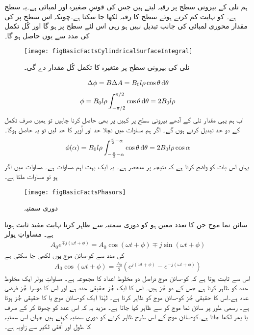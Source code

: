 	ہم نلی کے بیرونی سطح پر رقبہ   لیتے ہیں جس کی قوسِ صغیرہ   اور لمبائی  ہے۔یہ سطح  ہے۔ کو نہایت کم کرتے ہوئے سطح کا رقبہ  لکھا جا سکتا ہے۔چونکہ اس سطح پر  کی مقدار محوری لمبائی  کی جانب تبدیل نہیں ہو رہی اس لئے سطح   پر  ہو گا اور کُل  تکمل کی مدد سے یوں حاصل ہو گا۔
\begin{figure}
\centering
\texttt{[image: figBasicFactsCylindricalSurfaceIntegral]}
\caption{نلی کی بیرونی سطح پر متغیرہ کا تکمل کُل مقدار دے گی۔}
\label{شکل_حقائق_نلکی_سطحی_تکمل}
\end{figure}
%
\begin{align}
\Delta \phi=B \Delta A=B_0 l \rho \cos \theta \dif \theta
\end{align}
%
\begin{align}
\phi = B_0 l \rho \int_{-\pi/2}^{\pi/2} \cos \theta \dif \theta =2 B_0 l \rho
\end{align}
اب ہم یہی مقدار نلی کے آدھے بیرونی سطح پر کہیں پر بھی حاصل کرنا چاہیں تو ہمیں صرف تکمل کے دو حد تبدیل کرنے ہوں گے۔  اگر ہم مساوات  میں نچلا حد  اور اُوپر کا حد  لیں تو یہ حاصل ہوگا۔
\begin{align}
\phi (\alpha) = B_0 l \rho \int_{-\frac{\pi}{2}-\alpha}^{\frac{\pi}{2}-\alpha} \cos \theta \dif \theta =2 B_0 l \rho \cos \alpha
\end{align}
یہاں   اس بات کو واضح کرتا ہے کہ نتیجہ  پر منحصر ہے۔ یہ ایک بہت اہم مساوات ہے۔ مساوات میں  اگر  ہو تو مساوات   ملتا ہے۔

\begin{figure}
\centering
\texttt{[image: figBasicFactsPhasors]}
\caption{دوری سمتیہ}
\label{شکل_حقائق_دوری_سمتیات}
\end{figure}
سائن نما موج جن کا تعدد معین ہو کو دوری سمتیہ سے ظاہر کرنا نہایت مفید ثابت ہوتا ہے۔ مساواتِ یولر
\begin{align}
A_0 e^{\mp j (\omega t + \phi)}=A_0 \cos (\omega t +\phi) \mp j \sin (\omega t+\phi)
\end{align}
کی مدد سے کو-سائن موج یوں لکھی جا سکتی ہے
\begin{align}
A_0 \cos (\omega t +\phi)=\frac{A_0}{2} \left(e^{j(\omega t +\phi)} -e^{-j(\omega t +\phi)}\right)
\end{align}
اس سے ثابت ہوتا ہے کہ کو-سائن موج دراصل دو مخلوط اعداد کا مجموعہ ہے۔ مساواتِ یولر ایک مخلوط عدد کو ظاہر کرتا ہے جس کے دو جُز ہیں۔ اس کا ایک جُز حقیقی عدد ہے اور اس کا دوسرا جُز فرضی عدد ہے۔اس کا حقیقی جُز کو-سائن موج کو ظاہر کرتا ہے۔ لہٰذا ایک کو-سائن موج   یا  کا حقیقی جُز ہوتا ہے۔ رسمی طور پر سائن نما موج کو  سے ظاہر کیا جاتا ہے۔ مزید یہ کہ اس عدد کو چھوٹا کر کے صرف  یا پھر  لکھا جاتا ہے۔کو-سائن موج کے اس طرح ظاہر کرنے کو دوری سمتیہ کہتے ہیں جہاں اس سمتیہ کا طول  اور اُفقی لکیر سے زاویہ  ہے۔

